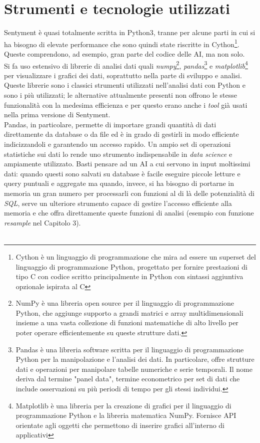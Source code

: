 \documentclass[a4paper,12pt]{report}
\begin{document}
\section{Strumenti e tecnologie utilizzati}
Sentyment è quasi totalmente scritta in Python3, tranne per alcune parti in cui si ha bisogno di elevate performance che sono quindi state riscritte in Cython\footnote{Cython è un linguaggio di programmazione che mira ad essere un superset del linguaggio di programmazione Python, progettato per fornire prestazioni di tipo C con codice scritto principalmente in Python con sintassi aggiuntiva opzionale ispirata al C}. Queste comprendono, ad esempio, gran parte del codice delle AI, ma non solo.\\
Si fa uso estensivo di librerie di analisi dati quali \textit{numpy}\footnote{NumPy è una libreria open source per il linguaggio di programmazione Python, che aggiunge supporto a grandi matrici e array multidimensionali insieme a una vasta collezione di funzioni matematiche di alto livello per poter operare efficientemente su queste strutture dati.}, \textit{pandas}\footnote{Pandas è una libreria software scritta per il linguaggio di programmazione Python per la manipolazione e l'analisi dei dati. In particolare, offre strutture dati e operazioni per manipolare tabelle numeriche e serie temporali. Il nome deriva dal termine "panel data", termine econometrico per set di dati che include osservazioni su più periodi di tempo per gli stessi individui.} e \textit{matplotlib}\footnote{Matplotlib è una libreria per la creazione di grafici per il linguaggio di programmazione Python e la libreria matematica NumPy. Fornisce API orientate agli oggetti che permettono di inserire grafici all'interno di applicativi} per visualizzare i grafici dei dati, soprattutto nella parte di sviluppo e analisi.\\
Queste librerie sono i classici strumenti utilizzati nell'analisi dati con Python e sono i più utilizzati; le alternative attualmente presenti non offrono le stesse funzionalità con la medesima efficienza e per questo erano anche i \textit{tool} già usati nella prima versione di Sentyment.\\
Pandas, in particolare, permette di importare grandi quantità di dati direttamente da database o da file ed è in grado di gestirli in modo efficiente indicizzandoli e garantendo un accesso rapido. Un ampio set di operazioni statistiche sui dati lo rende uno strumento indispensabile in \textit{data science} e ampiamente utilizzato. Basti pensare ad un AI a cui servono in input moltissimi dati: quando questi sono salvati su database è facile eseguire piccole letture e query puntuali e aggregate ma quando, invece, si ha bisogno di portarne in memoria un gran numero per processarli con funzioni al di là delle potenzialità di \textit{SQL}, serve un ulteriore strumento capace di gestire l'accesso efficiente alla memoria e che offra direttamente queste funzioni di analisi (esempio con funzione \textit{resample} nel Capitolo 3).\\~\\
\end{document}

